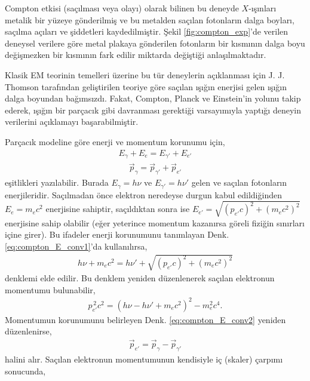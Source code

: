 \documentclass[a4paper,12pt, twoside]{article}
\begin{document}
Compton etkisi (saçılması veya olayı) olarak bilinen bu deneyde $X$-ışınları metalik bir yüzeye gönderilmiş ve bu metalden saçılan fotonların dalga boyları, saçılma açıları ve şiddetleri kaydedilmiştir. Şekil \ref{fig:compton_exp}'de verilen deneysel verilere göre metal plakaya gönderilen fotonların bir kısmının dalga boyu değişmezken bir kısmının fark edilir miktarda değiştiği anlaşılmaktadır.

Klasik EM teorinin temelleri üzerine bu tür deneylerin açıklanması için J. J. Thomson \cite{Thomson1906}  tarafından geliştirilen teoriye göre saçılan ışığın enerjisi gelen ışığın dalga boyundan bağımsızdı. Fakat, Compton, Planck ve Einstein'in yolunu takip ederek, ışığın bir parçacık gibi davranması gerektiği varsayımıyla yaptığı deneyin verilerini açıklamayı başarabilmiştir.

Parçacık modeline göre enerji ve momentum korunumu için,
\begin{align}
\label{eq:compton_E_conv1}
E_\gamma + E_e = E_{\gamma'} + E_{e'}
\end{align}
\begin{align}
\label{eq:compton_E_conv2}
\vec{p}_\gamma = \vec{p}_{\gamma'} + \vec{p}_{e'}
\end{align}
eşitlikleri yazılabilir. Burada $E_{\gamma} = h\nu$ ve $E_{\gamma'} = h\nu'$ gelen ve saçılan fotonların enerjileridir. Saçılmadan önce elektron neredeyse durgun kabul edildiğinden $E_e = m_ec^2$ enerjisine sahiptir, saçıldıktan sonra ise $E_{e'} = \sqrt{(p_{e'}c)^2 + (m_ec^2)^2}$ enerjisine sahip olabilir (eğer yeterince momentum kazanırsa göreli fiziğin sınırları içine girer). Bu ifadeler  enerji korunumunu tanımlayan Denk. \ref{eq:compton_E_conv1}'da kullanılırsa,
\begin{align}
\label{eq:compton_E_conv3}
h\nu + m_e c^2 = h\nu' + \sqrt{(p_{e'}c)^2 + (m_e c^2)^2}
\end{align}
\noindent denklemi elde edilir. Bu denklem yeniden düzenlenerek saçılan elektronun momentumu bulunabilir,
\begin{align}
\label{eq:compton_E_conv4}
p_{e'}^{\, 2}c^2 = (h\nu - h\nu' + m_{e}c^2)^2-m_{e}^2c^4.
\end{align}
Momentumun korunumunu belirleyen Denk. \ref{eq:compton_E_conv2} yeniden düzenlenirse,
\begin{align}
\label{eq:compton_E_conv5}
\vec{p}_{e'} = \vec{p}_\gamma - \vec{p}_{\gamma'}
\end{align}
halini alır. Saçılan elektronun momentumunun kendisiyle iç (skaler) çarpımı sonucunda,
\end{document}
